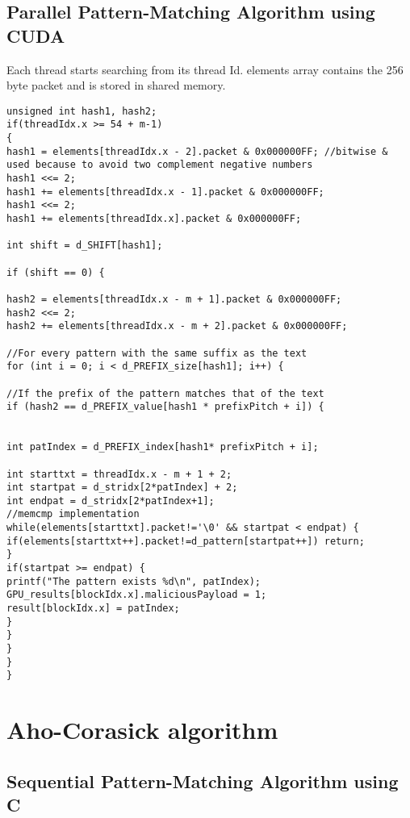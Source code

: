 \subsection{Parallel Pattern-Matching Algorithm using CUDA}
Each thread starts searching from its thread Id. elements array contains the 256 byte packet and is stored in shared memory.
\begin{lstlisting}
unsigned int hash1, hash2;
if(threadIdx.x >= 54 + m-1)
{
hash1 = elements[threadIdx.x - 2].packet & 0x000000FF; //bitwise & used because to avoid two complement negative numbers
hash1 <<= 2;
hash1 += elements[threadIdx.x - 1].packet & 0x000000FF;
hash1 <<= 2;
hash1 += elements[threadIdx.x].packet & 0x000000FF;

int shift = d_SHIFT[hash1];

if (shift == 0) {

hash2 = elements[threadIdx.x - m + 1].packet & 0x000000FF;
hash2 <<= 2;
hash2 += elements[threadIdx.x - m + 2].packet & 0x000000FF;

//For every pattern with the same suffix as the text
for (int i = 0; i < d_PREFIX_size[hash1]; i++) {

//If the prefix of the pattern matches that of the text
if (hash2 == d_PREFIX_value[hash1 * prefixPitch + i]) {


int patIndex = d_PREFIX_index[hash1* prefixPitch + i];

int starttxt = threadIdx.x - m + 1 + 2;
int startpat = d_stridx[2*patIndex] + 2;
int endpat = d_stridx[2*patIndex+1];
//memcmp implementation
while(elements[starttxt].packet!='\0' && startpat < endpat) {
if(elements[starttxt++].packet!=d_pattern[startpat++]) return;
}
if(startpat >= endpat) { 
printf("The pattern exists %d\n", patIndex);
GPU_results[blockIdx.x].maliciousPayload = 1;
result[blockIdx.x] = patIndex;
}
}
}
}
}
\end{lstlisting}
\vspace{\topsep}
\section{Aho-Corasick algorithm}
\vspace{\topsep}
\subsection{Sequential Pattern-Matching Algorithm using C}
\vspace{\topsep}
